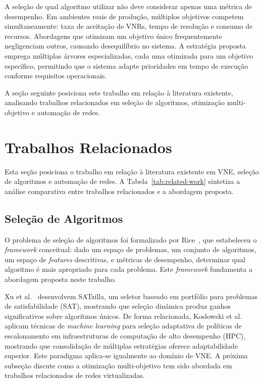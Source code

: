 \documentclass[conference]{IEEEtran}
\begin{document}
A seleção de qual algoritmo utilizar não deve considerar apenas uma métrica de desempenho. Em ambientes reais de produção, múltiplos objetivos competem simultaneamente: taxa de aceitação de VNRs, tempo de resolução e consumo de recursos. Abordagens que otimizam um objetivo único frequentemente negligenciam outros, causando desequilíbrio no sistema. A estratégia proposta emprega múltiplas árvores especializadas, cada uma otimizada para um objetivo específico, permitindo que o sistema adapte prioridades em tempo de execução conforme requisitos operacionais.

A seção seguinte posiciona este trabalho em relação à literatura existente, analisando trabalhos relacionados em seleção de algoritmos, otimização multi-objetivo e automação de redes.

\section{Trabalhos Relacionados}
\label{sec:RelatedWork}

Esta seção posiciona o trabalho em relação à literatura existente em VNE, seleção de algoritmos e automação de redes.
A Tabela~\ref{tab:related-work} sintetiza a análise comparativa entre trabalhos relacionados e a abordagem proposta.

\subsection{Seleção de Algoritmos}
\label{subsec:alg-selection}

O problema de seleção de algoritmos foi formalizado por Rice~\cite{rice1976algorithm}, que estabeleceu o \textit{framework} conceitual: dado um espaço de problemas, um conjunto de algoritmos, um espaço de \textit{features} descritivas, e métricas de desempenho, determinar qual algoritmo é mais apropriado para cada problema. Este \textit{framework} fundamenta a abordagem proposta neste trabalho.

Xu et al.~\cite{xu2012satzilla} desenvolvem SATzilla, um seletor baseado em portfólio para problemas de satisfabilidade (SAT), mostrando que seleção dinâmica produz ganhos significativos sobre algoritmos únicos. De forma relacionada, Koslowski et al.~\cite{koslowski2025knowledge-based} aplicam técnicas de \textit{machine learning} para seleção adaptativa de políticas de escalonamento em infraestruturas de computação de alto desempenho (HPC), mostrando que consolidação de múltiplas estratégias oferece adaptabilidade superior. Este paradigma aplica-se igualmente ao domínio de VNE. A próxima subseção discute como a otimização multi-objetivo tem sido abordada em trabalhos relacionados de redes virtualizadas.
\end{document}
